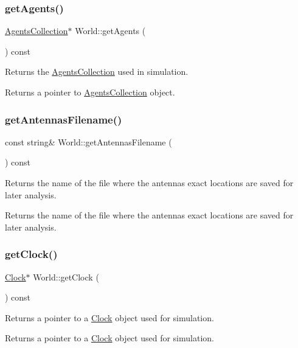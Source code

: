 \subsubsection{\texorpdfstring{get\+Agents()}{getAgents()}}
{\footnotesize\ttfamily \hyperlink{class_agents_collection}{Agents\+Collection}$\ast$ World\+::get\+Agents (\begin{DoxyParamCaption}{ }\end{DoxyParamCaption}) const}

Returns the \hyperlink{class_agents_collection}{Agents\+Collection} used in simulation. \begin{DoxyReturn}{Returns}
a pointer to \hyperlink{class_agents_collection}{Agents\+Collection} object. 
\end{DoxyReturn}
\mbox{\label{class_world_a5baa256a1e856e635830e0a1c9cce37b}} 
\subsubsection{\texorpdfstring{get\+Antennas\+Filename()}{getAntennasFilename()}}
{\footnotesize\ttfamily const string\& World\+::get\+Antennas\+Filename (\begin{DoxyParamCaption}{ }\end{DoxyParamCaption}) const}

Returns the name of the file where the antennas exact locations are saved for later analysis. \begin{DoxyReturn}{Returns}
the name of the file where the antennas exact locations are saved for later analysis. 
\end{DoxyReturn}
\mbox{\label{class_world_a79423d285338cbe0ea501369e93e78b4}} 
\subsubsection{\texorpdfstring{get\+Clock()}{getClock()}}
{\footnotesize\ttfamily \hyperlink{class_clock}{Clock}$\ast$ World\+::get\+Clock (\begin{DoxyParamCaption}{ }\end{DoxyParamCaption}) const}

Returns a pointer to a \hyperlink{class_clock}{Clock} object used for simulation. \begin{DoxyReturn}{Returns}
a pointer to a \hyperlink{class_clock}{Clock} object used for simulation. 
\end{DoxyReturn}
\mbox{\label{class_world_a35aafc469b9146b4b6f72c6adaa3e067}} 
